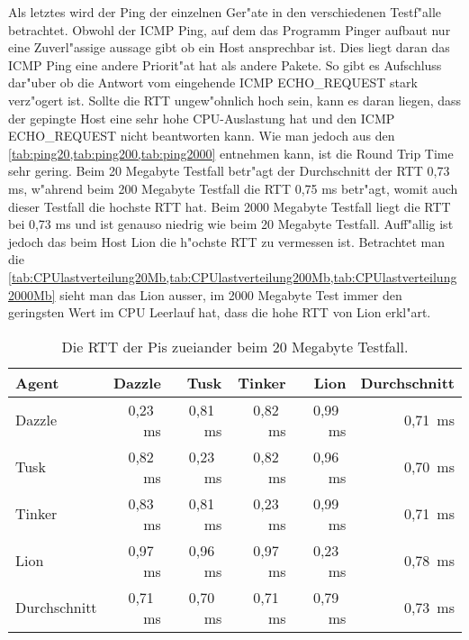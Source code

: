 Als letztes wird der Ping der einzelnen Ger"ate in den verschiedenen Testf"alle betrachtet. %
Obwohl der ICMP Ping, auf dem das Programm Pinger aufbaut nur eine Zuverl"assige aussage gibt ob ein Host %
ansprechbar ist. Dies liegt daran das ICMP Ping eine andere Priorit"at hat als andere Pakete. So gibt es Aufschluss dar"uber ob die Antwort vom eingehende %
ICMP ECHO\_REQUEST stark verz"ogert ist. Sollte die RTT ungew"ohnlich hoch sein, kann es daran liegen, %
dass der gepingte Host eine sehr hohe CPU-Auslastung hat und den ICMP ECHO\_REQUEST nicht beantworten kann. %
Wie man jedoch aus den \cref{tab:ping20,tab:ping200,tab:ping2000} entnehmen kann, ist die Round Trip Time %
sehr gering. Beim 20 Megabyte Testfall betr"agt der Durchschnitt der RTT 0,73 ms, w"ahrend beim 200 Megabyte %
Testfall die RTT 0,75 ms betr"agt, womit auch dieser Testfall die hochste RTT hat. Beim 2000 Megabyte Testfall %
liegt die RTT bei 0,73 ms und ist genauso niedrig wie beim 20 Megabyte Testfall. Auff"allig ist jedoch %
das beim Host Lion die h"ochste RTT zu vermessen ist. Betrachtet man die \cref{tab:CPUlastverteilung20Mb,tab:CPUlastverteilung200Mb,tab:CPUlastverteilung2000Mb} %
sieht man das Lion ausser, im 2000 Megabyte Test immer den geringsten Wert im CPU Leerlauf hat, %
dass die hohe RTT von Lion erkl"art. 
  
\begin{table}
\centering
\begin{tabular}{l%
 r<{\,ms}%
 r<{\,ms}%
 r<{\,ms}%
 r<{\,ms}%
 r<{\,ms}%
}
Agent  				& \multicolumn{1}{r}{Dazzle}	& \multicolumn{1}{r}{Tusk}	& \multicolumn{1}{r}{Tinker}	& \multicolumn{1}{r}{Lion}	& \multicolumn{1}{r}{Durchschnitt}		\\
\hline
Dazzle 				& 0,23				& 0,81				& 0,82				& 0,99				& 0,71		\\
Tusk 				& 0,82				& 0,23				& 0,82				& 0,96				& 0,70		\\
Tinker				& 0,83				& 0,81				& 0,23				& 0,99				& 0,71		\\
Lion				& 0,97				& 0,96				& 0,97				& 0,23				& 0,78		\\ 
Durchschnitt			& 0,71				& 0,70				& 0,71 				& 0,79				& 0,73		\\
\end{tabular}
\caption{Die RTT der Pis zueiander beim 20 Megabyte Testfall.}
\label{tab:ping20}
\end{table}

